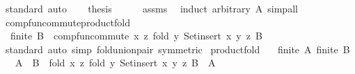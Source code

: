 \begin{isabellebody}
\ standard\ auto\isanewline
\ \ \isamarkupfalse%
\ {\isacharquery}{\kern0pt}thesis\isanewline
\ \ \ \ \isamarkupfalse%
\ assms\ \isamarkupfalse%
\ {\isacharparenleft}{\kern0pt}induct\ arbitrary{\isacharcolon}{\kern0pt}\ A{\isacharparenright}{\kern0pt}\ simp{\isacharunderscore}{\kern0pt}all\isanewline
{}\isamarkupfalse%
%
\endisatagproof
{\isafoldproof}%
%
\isadelimproof
\isanewline
%
\endisadelimproof
\isanewline
{}\isamarkupfalse%
\ comp{\isacharunderscore}{\kern0pt}fun{\isacharunderscore}{\kern0pt}commute{\isacharunderscore}{\kern0pt}product{\isacharunderscore}{\kern0pt}fold{\isacharcolon}{\kern0pt}\isanewline
\ \ {\isachardoublequoteopen}finite\ B\ {\isasymLongrightarrow}\ comp{\isacharunderscore}{\kern0pt}fun{\isacharunderscore}{\kern0pt}commute\ {\isacharparenleft}{\kern0pt}{\isasymlambda}x\ z{\isachardot}{\kern0pt}\ fold\ {\isacharparenleft}{\kern0pt}{\isasymlambda}y{\isachardot}{\kern0pt}\ Set{\isachardot}{\kern0pt}insert\ {\isacharparenleft}{\kern0pt}x{\isacharcomma}{\kern0pt}\ y{\isacharparenright}{\kern0pt}{\isacharparenright}{\kern0pt}\ z\ B{\isacharparenright}{\kern0pt}{\isachardoublequoteclose}\isanewline
%
\isadelimproof
\ \ %
\endisadelimproof
%
\isatagproof
{}\isamarkupfalse%
\ standard\ {\isacharparenleft}{\kern0pt}auto\ simp{\isacharcolon}{\kern0pt}\ fold{\isacharunderscore}{\kern0pt}union{\isacharunderscore}{\kern0pt}pair\ {\isacharbrackleft}{\kern0pt}symmetric{\isacharbrackright}{\kern0pt}{\isacharparenright}{\kern0pt}%
\endisatagproof
{\isafoldproof}%
%
\isadelimproof
\isanewline
%
\endisadelimproof
\isanewline
{}\isamarkupfalse%
\ product{\isacharunderscore}{\kern0pt}fold{\isacharcolon}{\kern0pt}\isanewline
\ \ \ {\isachardoublequoteopen}finite\ A{\isachardoublequoteclose}\ {\isachardoublequoteopen}finite\ B{\isachardoublequoteclose}\isanewline
\ \ \ {\isachardoublequoteopen}A\ {\isasymtimes}\ B\ {\isacharequal}{\kern0pt}\ fold\ {\isacharparenleft}{\kern0pt}{\isasymlambda}x\ z{\isachardot}{\kern0pt}\ fold\ {\isacharparenleft}{\kern0pt}{\isasymlambda}y{\isachardot}{\kern0pt}\ Set{\isachardot}{\kern0pt}insert\ {\isacharparenleft}{\kern0pt}x{\isacharcomma}{\kern0pt}\ y{\isacharparenright}{\kern0pt}{\isacharparenright}{\kern0pt}\ z\ B{\isacharparenright}{\kern0pt}\ {\isacharbraceleft}{\kern0pt}{\isacharbraceright}{\kern0pt}\ A{\isachardoublequoteclose}\isanewline
%
\isadelimproof
%
\endisadelimproof
%
\isatagproof
{}\isamarkupfalse%
\ {\isacharminus}{\kern0pt}\isanewline
\ \ \isamarkupfalse%

\end{isabellebody}
